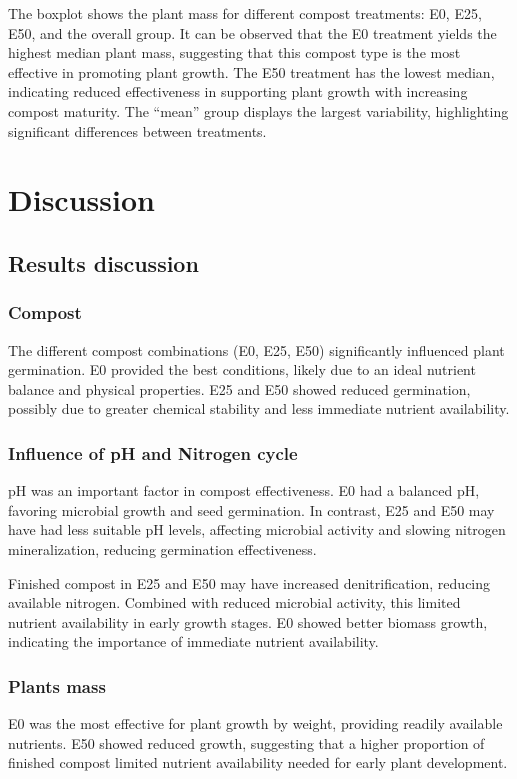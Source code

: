 \documentclass{article}
\begin{document}
\vspace*{.5cm}
The boxplot shows the plant mass for different compost treatments:
E0, E25, E50, and the overall group. It can be observed that the E0
treatment yields the highest median plant mass, suggesting that this
compost type is the most effective in promoting plant growth. The E50
treatment has the lowest median, indicating reduced effectiveness in
supporting plant growth with increasing compost maturity. The ``mean''
group displays the largest variability, highlighting significant
differences between treatments.

\newpage
\section{Discussion}
\subsection{Results discussion}
\subsubsection{Compost}
The different compost combinations (E0, E25, E50) significantly influenced plant
germination. E0 provided the best conditions, likely due to an ideal nutrient balance and
physical properties. E25 and E50 showed reduced germination, possibly due to greater
chemical stability and less immediate nutrient availability.

\subsubsection{Influence of pH and Nitrogen cycle}
pH was an important factor in compost effectiveness. E0 had a balanced pH, favoring
microbial growth and seed germination. In contrast, E25 and E50 may have had less suitable
pH levels, affecting microbial activity and slowing nitrogen mineralization, reducing
germination effectiveness.

Finished compost in E25 and E50 may have increased denitrification, reducing available
nitrogen. Combined with reduced microbial activity, this limited nutrient availability in
early growth stages. E0 showed better biomass growth, indicating the importance of
immediate nutrient availability.

\subsubsection{Plants mass}
E0 was the most effective for plant growth by weight, providing readily available
nutrients. E50 showed reduced growth, suggesting that a higher proportion of finished
compost limited nutrient availability needed for early plant development.
\end{document}
